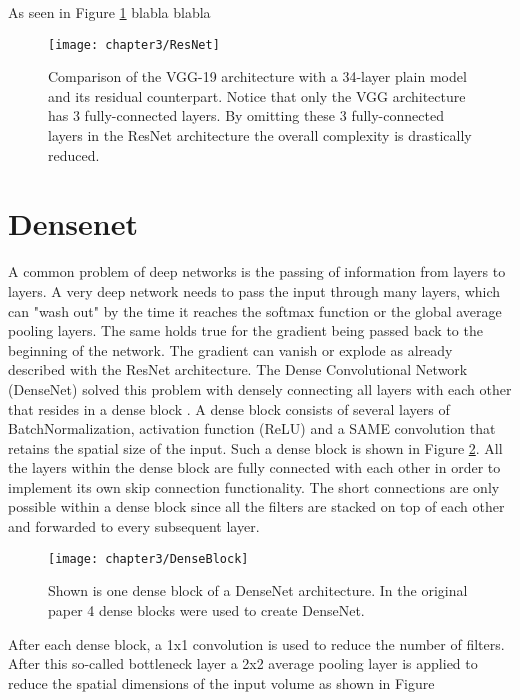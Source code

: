 As seen in Figure \ref{fig:ResNet} blabla blabla

\begin{figure}[H]
  \centering
  \caption{Comparison of the VGG-19 architecture with a 34-layer plain model and its residual counterpart. Notice that only the VGG architecture has 3 fully-connected layers. By omitting these 3 fully-connected layers in the ResNet architecture the overall complexity is drastically reduced. \cite{he2016deep}}
  \texttt{[image: chapter3/ResNet]}
  \label{fig:ResNet}
\end{figure}

\section{Densenet}

A common problem of deep networks is the passing of information from layers to layers. A very deep network needs to pass the input through many layers, which can "wash out" by the time it reaches the softmax function or the global average pooling layers. The same holds true for the gradient being passed back to the beginning of the network. The gradient can vanish or explode as already described with the ResNet architecture. The Dense Convolutional Network (DenseNet) solved this problem with densely connecting all layers with each other that resides in a dense block \cite{huang2017densely}. A dense block
consists of several layers of BatchNormalization, activation function (ReLU) and a SAME convolution that retains the spatial size of the input. Such a dense block is shown in Figure \ref{fig:DenseBlock}. All the layers within the dense block are fully connected with each other in order to implement its own skip connection functionality. The short connections are only possible within a dense block since all the filters are stacked on top of each other and forwarded to every subsequent layer.

\begin{figure}[H]
  \centering
  \caption{Shown is one dense block of a DenseNet architecture. In the original paper 4 dense blocks were used to create DenseNet. \cite{huang2017densely}}
  \texttt{[image: chapter3/DenseBlock]}
  \label{fig:DenseBlock}
\end{figure}

After each dense block, a 1x1 convolution is used to reduce the number of filters. After this so-called bottleneck layer a 2x2 average pooling layer is applied to reduce the spatial dimensions of the input volume as shown in Figure


